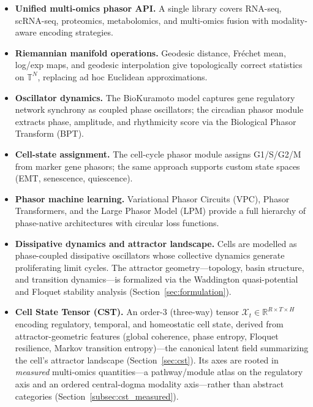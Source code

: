 \documentclass[preprint,12pt,amsmath,amssymb,superscriptaddress,floatfix]{revtex4-2}
\newcommand{\reals}{\mathbb{R}}
\newcommand{\torus}{\mathbb{T}}
\begin{document}
\begin{itemize}
    \item \textbf{Unified multi-omics phasor API.}
    A single library covers RNA-seq, scRNA-seq, proteomics, metabolomics,
    and multi-omics fusion with modality-aware encoding strategies.

    \item \textbf{Riemannian manifold operations.}
    Geodesic distance, Fr\'{e}chet mean, log/exp maps, and geodesic
    interpolation give topologically correct statistics on $\torus^N$,
    replacing ad hoc Euclidean approximations.

    \item \textbf{Oscillator dynamics.}
    The BioKuramoto model captures gene regulatory network synchrony as coupled
    phase oscillators; the circadian phasor module extracts phase, amplitude,
    and rhythmicity score via the Biological Phasor Transform (BPT).

    \item \textbf{Cell-state assignment.}
    The cell-cycle phasor module assigns G1/S/G2/M from marker gene phasors;
    the same approach supports custom state spaces (EMT, senescence, quiescence).

    \item \textbf{Phasor machine learning.}
    Variational Phasor Circuits (VPC), Phasor Transformers, and the Large
    Phasor Model (LPM) provide a full hierarchy of phase-native
    architectures with circular loss functions.

    \item \textbf{Dissipative dynamics and attractor landscape.}
    Cells are modelled as phase-coupled dissipative oscillators whose
    collective dynamics generate proliferating limit cycles.  The
    attractor geometry---topology, basin structure, and transition
    dynamics---is formalized via the Waddington quasi-potential and
    Floquet stability analysis (Section~\ref{sec:formulation}).

    \item \textbf{Cell State Tensor (CST).}
    An order-3 (three-way) tensor $\mathcal{X}_t \in \reals^{R \times T \times H}$
    encoding regulatory, temporal, and homeostatic cell state, derived
    from attractor-geometric features (global coherence, phase entropy,
    Floquet resilience, Markov transition entropy)---the canonical
    latent field summarizing the cell's attractor landscape
    (Section~\ref{sec:cst}). Its axes are rooted in \emph{measured}
    multi-omics quantities---a pathway/module atlas on the regulatory axis
    and an ordered central-dogma modality axis---rather than abstract
    categories (Section~\ref{subsec:cst_measured}).


\end{itemize}
\end{document}
